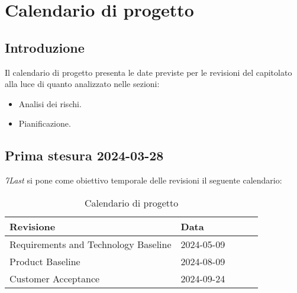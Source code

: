 \section{Calendario di progetto}
\subsection{Introduzione}
Il calendario di progetto presenta le date previste per le revisioni del capitolato alla luce di quanto analizzato nelle sezioni:
\begin{itemize}
    \item Analisi dei rischi.
    \item Pianificazione.
\end{itemize}

\subsection{Prima stesura 2024-03-28}
\textit{7Last} si pone come obiettivo temporale delle revisioni il seguente calendario:
\begin{table}[!h]
    \begin{center}
        \begin{tabular}{ | l | l | l | l | l | }
            \hline
            Revisione                               & Data       \\ \hline
            Requirements and Technology Baseline    & 2024-05-09 \\
            Product Baseline                        & 2024-08-09 \\
            Customer Acceptance                     & 2024-09-24 \\
            \hline
        \end{tabular}
    \end{center}
    \caption{Calendario di progetto}
    \label{tab:10}
\end{table}
\newpage

